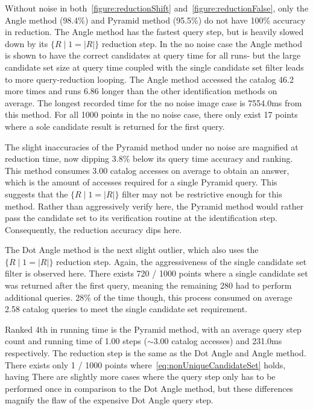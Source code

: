 Without noise in both~\autoref{figure:reductionShift} and~\autoref{figure:reductionFalse}, only the Angle method
(98.4\%) and Pyramid method (95.5\%) do not have 100\% accuracy in reduction.
The Angle method has the fastest query step, but is heavily slowed down by its $\{ R \mid 1 = |R|\}$ reduction step.
In the no noise case the Angle method is shown to have the correct candidates at query time for all runs- but
the large candidate set size at query time coupled with the single candidate set filter leads to more query-reduction
looping.
The Angle method accessed the catalog 46.2 more times and runs 6.86 longer than the other identification methods on
average.
The longest recorded time for the no noise image case is 7554.0ms from this method.
For all 1000 points in the no noise case, there only exist 17 points where a sole candidate result is returned for the
first query.

The slight inaccuracies of the Pyramid method under no noise are magnified at reduction time, now dipping 3.8\% below
its query time accuracy and ranking.
This method consumes 3.00 catalog accesses on average to obtain an answer, which is the amount of accesses required
for a single Pyramid query.
This suggests that the $\{ R \mid 1 = |R|\}$ filter may not be restrictive enough for this method.
Rather than aggressively verify here, the Pyramid method would rather pass the candidate set to its verification routine
 at the identification step.
Consequently, the reduction accuracy dips here.

The Dot Angle method is the next slight outlier, which also uses the $\{ R \mid 1 = |R| \}$ reduction step.
Again, the aggressiveness of the single candidate set filter is observed here.
There exists 720 / 1000 points where a single candidate set was returned after the first query, meaning the remaining
280 had to perform additional queries.
28\% of the time though, this process consumed on average 2.58 catalog queries to meet the single candidate set
requirement.

Ranked 4th in running time is the Pyramid method, with an average query step count and running time of 1.00 steps
($\sim$3.00 catalog accesses) and 231.0ms respectively.
The reduction step is the same as the Dot Angle and Angle method.
There exists only 1 / 1000 points where~\autoref{eq:nonUniqueCandidateSet} holds, having
There are slightly more cases where the query step only has to be performed once in comparison to the Dot Angle method,
but these differences magnify the flaw of the expensive Dot Angle query step.

